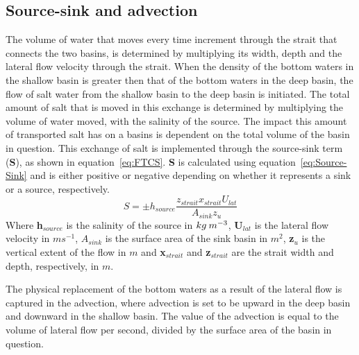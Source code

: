 \documentclass[twocolumn]{article}
\begin{document}



\subsection{Source-sink and advection}
The volume of water that moves every time increment through the strait that connects the two basins, is determined by multiplying its width, depth and the lateral flow velocity through the strait. When the density of the bottom waters in the shallow basin is greater then that of the bottom waters in the deep basin, the flow of salt water from the shallow basin to the deep basin is initiated. The total amount of salt that is moved in this exchange is determined by multiplying the volume of water moved, with the salinity of the source. The impact this amount of transported salt has on a basins is dependent on the total volume of the basin in question. This exchange of salt is implemented through the source-sink term (\textbf{S}), as shown in equation~\ref{eq:FTCS}. \textbf{S} is calculated using equation~\ref{eq:Source-Sink} and is either positive or negative depending on whether it represents a sink or a source, respectively.
\begin{equation}
    S = \pm h_{source} \frac{ z_{strait} x_{strait} U_{lat} }{A_{sink} z_u} 
    \label{eq:Source-Sink}
\end{equation}
Where \textbf{h}$_{source}$ is the salinity of the source in $kg \hspace{0.8mm} m^{-3}$, \textbf{U}$_{lat}$ is the lateral flow velocity in $ms^{-1}$, $A_{sink}$ is the surface area of the sink basin in $m^2$, \textbf{z}$_u$ is the vertical extent of the flow in $m$ and \textbf{x}$_{strait}$ and \textbf{z}$_{strait}$ are the strait width and depth, respectively, in $m$.

The physical replacement of the bottom waters as a result of the lateral flow is captured in the advection, where advection is set to be upward in the deep basin and downward in the shallow basin. The value of the advection is equal to the volume of lateral flow per second, divided by the surface area of the basin in question. 
\end{document}
